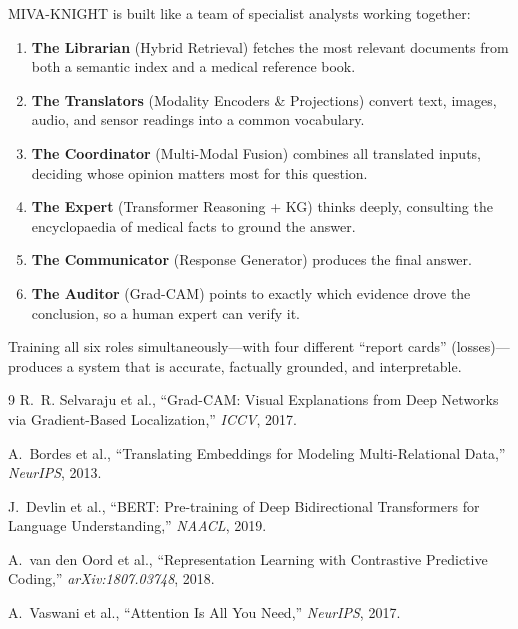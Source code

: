 \documentclass[12pt,a4paper]{article}
\newenvironment{plainbox}[1]{%
  \begin{tcolorbox}[myplain,title={#1}]
}{%
  \end{tcolorbox}
}
\begin{document}
\begin{plainbox}{Final Plain-English Summary}
MIVA-KNIGHT is built like a team of specialist analysts working together:
\begin{enumerate}
  \item \textbf{The Librarian} (Hybrid Retrieval) fetches the most relevant documents
        from both a semantic index and a medical reference book.
  \item \textbf{The Translators} (Modality Encoders \& Projections) convert text,
        images, audio, and sensor readings into a common vocabulary.
  \item \textbf{The Coordinator} (Multi-Modal Fusion) combines all translated inputs,
        deciding whose opinion matters most for this question.
  \item \textbf{The Expert} (Transformer Reasoning + KG) thinks deeply, consulting
        the encyclopaedia of medical facts to ground the answer.
  \item \textbf{The Communicator} (Response Generator) produces the final answer.
  \item \textbf{The Auditor} (Grad-CAM) points to exactly which evidence drove the
        conclusion, so a human expert can verify it.
\end{enumerate}
Training all six roles simultaneously—with four different ``report cards'' (losses)—
produces a system that is accurate, factually grounded, and interpretable.
\end{plainbox}

\begin{thebibliography}{9}
  R.~R. Selvaraju et al.,
  ``Grad-CAM: Visual Explanations from Deep Networks via Gradient-Based
    Localization,''
  \emph{ICCV}, 2017.

  A.~Bordes et al.,
  ``Translating Embeddings for Modeling Multi-Relational Data,''
  \emph{NeurIPS}, 2013.

  J.~Devlin et al.,
  ``BERT: Pre-training of Deep Bidirectional Transformers for Language
    Understanding,''
  \emph{NAACL}, 2019.

  A.~van den Oord et al.,
  ``Representation Learning with Contrastive Predictive Coding,''
  \emph{arXiv:1807.03748}, 2018.

  A.~Vaswani et al.,
  ``Attention Is All You Need,''
  \emph{NeurIPS}, 2017.
\end{thebibliography}
\end{document}
